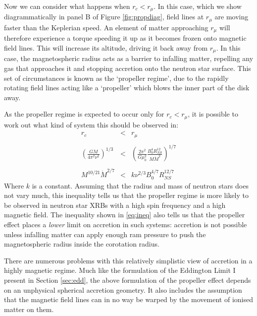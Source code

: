 \par Now we can consider what happens when $r_c<r_\mu$.  In this case, which we show diagrammatically in panel B of Figure \ref{fig:propdiag}, field lines at $r_\mu$ are moving faster than the Keplerian speed.  An element of matter approaching $r_\mu$ will therefore experience a torque speeding it up as it becomes frozen onto magnetic field lines.  This will increase its altitude, driving it back away from $r_\mu$.  In this case, the magnetospheric radius acts as a barrier to infalling matter, repelling any gas that approaches it and stopping accretion onto the neutron star surface.  This set of circumstances is known as the `propeller regime', due to the rapidly rotating field lines acting like a `propeller' which blows the inner part of the disk away.
\par As the propeller regime is expected to occur only for $r_c<r_\mu$, it is possible to work out what kind of system this should be observed in:
\begin{eqnarray}
r_c&<&r_\mu\\ \nonumber \\
\left(\frac{GM}{4\pi^2\nu^2}\right)^{1/3}&<&\left(\frac{2\pi^2}{G\mu_0^2}\frac{B_0^4R_{NS}^{12}}{M\dot{M}^2}\right)^{1/7}\\ \nonumber \\
M^{10/21}\dot{M}^{2/7}&<&k\nu^{2/3}B_0^{4/7}R_{NS}^{12/7}\label{eq:ineq}
\end{eqnarray}
Where $k$ is a constant.  Assuming that the radius and mass of neutron stars does not vary much, this inequality tells us that the propeller regime is more likely to be observed in neutron star XRBs with a high spin frequency and a high magnetic field.  The inequality shown in \ref{eq:ineq} also tells us that the propeller effect places a \textit{lower} limit on accretion in such systems: accretion is not possible unless infalling matter can apply enough ram pressure to push the magnetospheric radius inside the corotation radius.
\par There are numerous problems with this relatively simplistic view of accretion in a highly magnetic regime.  Much like the formulation of the Eddington Limit I present in Section \ref{sec:edd}, the above formulation of the propeller effect depends on an unphysical spherical accretion geometry.  It also includes the assumption that the magnetic field lines can in no way be warped by the movement of ionised matter on them.
